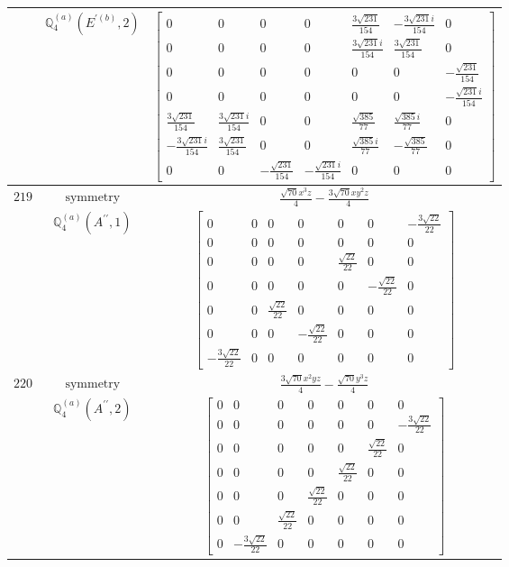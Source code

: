 \documentclass[fleqn,8pt,landscape]{jsarticle}
\begin{document}
\begin{longtable}{ccc}
$  $ & $ \mathbb{Q}_{4}^{(a)}(E^{\prime(b)},2) $ & $ \begin{bmatrix} 0 & 0 & 0 & 0 & \frac{3 \sqrt{231}}{154} & - \frac{3 \sqrt{231} i}{154} & 0 \\ 0 & 0 & 0 & 0 & \frac{3 \sqrt{231} i}{154} & \frac{3 \sqrt{231}}{154} & 0 \\ 0 & 0 & 0 & 0 & 0 & 0 & - \frac{\sqrt{231}}{154} \\ 0 & 0 & 0 & 0 & 0 & 0 & - \frac{\sqrt{231} i}{154} \\ \frac{3 \sqrt{231}}{154} & \frac{3 \sqrt{231} i}{154} & 0 & 0 & \frac{\sqrt{385}}{77} & \frac{\sqrt{385} i}{77} & 0 \\ - \frac{3 \sqrt{231} i}{154} & \frac{3 \sqrt{231}}{154} & 0 & 0 & \frac{\sqrt{385} i}{77} & - \frac{\sqrt{385}}{77} & 0 \\ 0 & 0 & - \frac{\sqrt{231}}{154} & - \frac{\sqrt{231} i}{154} & 0 & 0 & 0 \end{bmatrix} $ \\ \hline
$ 219 $ & $ \text{symmetry} $ & $ \frac{\sqrt{70} x^{3} z}{4} - \frac{3 \sqrt{70} x y^{2} z}{4} $ \\
$  $ & $ \mathbb{Q}_{4}^{(a)}(A^{\prime\prime},1) $ & $ \begin{bmatrix} 0 & 0 & 0 & 0 & 0 & 0 & - \frac{3 \sqrt{22}}{22} \\ 0 & 0 & 0 & 0 & 0 & 0 & 0 \\ 0 & 0 & 0 & 0 & \frac{\sqrt{22}}{22} & 0 & 0 \\ 0 & 0 & 0 & 0 & 0 & - \frac{\sqrt{22}}{22} & 0 \\ 0 & 0 & \frac{\sqrt{22}}{22} & 0 & 0 & 0 & 0 \\ 0 & 0 & 0 & - \frac{\sqrt{22}}{22} & 0 & 0 & 0 \\ - \frac{3 \sqrt{22}}{22} & 0 & 0 & 0 & 0 & 0 & 0 \end{bmatrix} $ \\ \hline
$ 220 $ & $ \text{symmetry} $ & $ \frac{3 \sqrt{70} x^{2} y z}{4} - \frac{\sqrt{70} y^{3} z}{4} $ \\
$  $ & $ \mathbb{Q}_{4}^{(a)}(A^{\prime\prime},2) $ & $ \begin{bmatrix} 0 & 0 & 0 & 0 & 0 & 0 & 0 \\ 0 & 0 & 0 & 0 & 0 & 0 & - \frac{3 \sqrt{22}}{22} \\ 0 & 0 & 0 & 0 & 0 & \frac{\sqrt{22}}{22} & 0 \\ 0 & 0 & 0 & 0 & \frac{\sqrt{22}}{22} & 0 & 0 \\ 0 & 0 & 0 & \frac{\sqrt{22}}{22} & 0 & 0 & 0 \\ 0 & 0 & \frac{\sqrt{22}}{22} & 0 & 0 & 0 & 0 \\ 0 & - \frac{3 \sqrt{22}}{22} & 0 & 0 & 0 & 0 & 0 \end{bmatrix} $ \\ \hline

\end{longtable}
\end{document}
